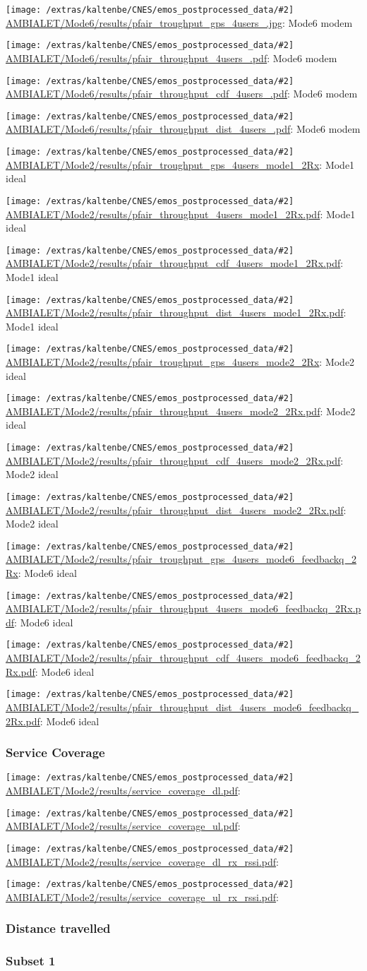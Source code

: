 \documentclass[a4paper,10pt]{article}
\newcommand{\printfile}[2][]{
 \begin{minipage}{8cm}
  \centering
  \texttt{[image: /extras/kaltenbe/CNES/emos\_postprocessed\_data/\#2]}
  \url{#2}: #1

 \end{minipage}
}
\begin{document}
\printfile[Mode6 modem]{AMBIALET/Mode6/results/pfair_troughput_gps_4users_.jpg}
\printfile[Mode6 modem]{AMBIALET/Mode6/results/pfair_throughput_4users_.pdf}

\printfile[Mode6 modem]{AMBIALET/Mode6/results/pfair_throughput_cdf_4users_.pdf}
\printfile[Mode6 modem]{AMBIALET/Mode6/results/pfair_throughput_dist_4users_.pdf}

\printfile[Mode1 ideal]{AMBIALET/Mode2/results/pfair_troughput_gps_4users_mode1_2Rx}
\printfile[Mode1 ideal]{AMBIALET/Mode2/results/pfair_throughput_4users_mode1_2Rx.pdf}

\printfile[Mode1 ideal]{AMBIALET/Mode2/results/pfair_throughput_cdf_4users_mode1_2Rx.pdf}
\printfile[Mode1 ideal]{AMBIALET/Mode2/results/pfair_throughput_dist_4users_mode1_2Rx.pdf}

\printfile[Mode2 ideal]{AMBIALET/Mode2/results/pfair_troughput_gps_4users_mode2_2Rx}
\printfile[Mode2 ideal]{AMBIALET/Mode2/results/pfair_throughput_4users_mode2_2Rx.pdf}

\printfile[Mode2 ideal]{AMBIALET/Mode2/results/pfair_throughput_cdf_4users_mode2_2Rx.pdf}
\printfile[Mode2 ideal]{AMBIALET/Mode2/results/pfair_throughput_dist_4users_mode2_2Rx.pdf}

\printfile[Mode6 ideal]{AMBIALET/Mode2/results/pfair_troughput_gps_4users_mode6_feedbackq_2Rx}
\printfile[Mode6 ideal]{AMBIALET/Mode2/results/pfair_throughput_4users_mode6_feedbackq_2Rx.pdf}

\printfile[Mode6 ideal]{AMBIALET/Mode2/results/pfair_throughput_cdf_4users_mode6_feedbackq_2Rx.pdf}
\printfile[Mode6 ideal]{AMBIALET/Mode2/results/pfair_throughput_dist_4users_mode6_feedbackq_2Rx.pdf}

\subsubsection{Service Coverage}

\printfile{AMBIALET/Mode2/results/service_coverage_dl.pdf}
\printfile{AMBIALET/Mode2/results/service_coverage_ul.pdf}

\printfile{AMBIALET/Mode2/results/service_coverage_dl_rx_rssi.pdf}
\printfile{AMBIALET/Mode2/results/service_coverage_ul_rx_rssi.pdf}

\subsubsection{Distance travelled}
\label{sec:dist_travelled_ambialet}

\subsubsection*{Subset 1}
\end{document}
